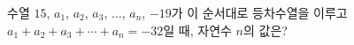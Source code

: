 수열 $15$, $a_1$, $a_2$, $a_3$, $\ldots$, $a_n$, $-19$가 이 순서대로 등차수열을 이루고 $a_1+a_2+a_3+\cdots+a_n=-32$일 때, 자연수 $n$의 값은?
